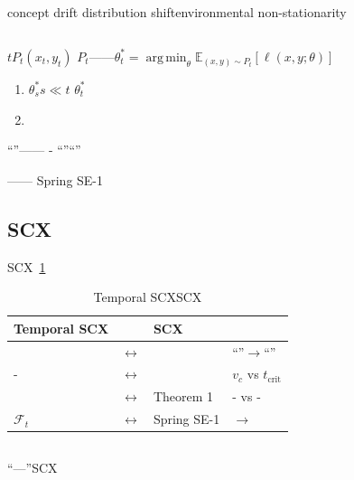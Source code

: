 \documentclass[11pt,a4paper]{article}
\theoremstyle{remark}
\DeclareMathOperator*{\argmin}{arg\,min}
\newcommand{\Fforget}{\mathcal{F}}
\newcommand{\E}{\mathbb{E}}
\begin{document}
\textbf{}concept drift
distribution shiftenvironmental non-stationarity

\textbf{}\textbf{}

\subsection{}

$t$$P_t$$(x_t, y_t)$
$P_t$——$\theta_t^* = \argmin_\theta \E_{(x,y)\sim P_t}[\ell(x,y;\theta)]$


\begin{enumerate}[label=(\arabic*)]
    \item \textbf{}\textbf{}$\theta_s^*$$s \ll t$
          $\theta_t^*$
    \item \textbf{}
          \textbf{}
\end{enumerate}

``''——\textbf{}
-
``''``''

——
Spring SE-1


\subsection{SCX}

SCX~\ref{tab:relation}

\begin{table}[htbp]
\centering
\caption{Temporal SCXSCX}
\label{tab:relation}
\begin{tabular}{@{}llll@{}}
\toprule
\textbf{Temporal SCX} & \textbf{} & \textbf{SCX} & \textbf{} \\
\midrule
 & $\leftrightarrow$ &  & ``''$\to$``'' \\
- & $\leftrightarrow$ &  & $v_c$ vs $t_{\text{crit}}$ \\
 & $\leftrightarrow$ & Theorem 1 & - vs - \\
$\Fforget_t$ & $\leftrightarrow$ & Spring SE-1 & $\to$ \\
\bottomrule
\end{tabular}
\end{table}

\subsection{}

``---''SCX



\end{document}

